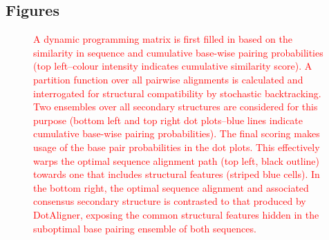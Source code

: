 \documentclass{bmcart}
\begin{document}
\begin{backmatter}





\section*{Figures}

\begin{figure}[h!]
 \caption {
 \textcolor{red}{
  A dynamic  programming matrix is first filled in based on the similarity in sequence 
  and cumulative base-wise pairing probabilities (top left--colour intensity
  indicates cumulative similarity score).  A partition function over all
  pairwise alignments is calculated and interrogated for structural
  compatibility by stochastic backtracking.  Two ensembles over all
  secondary structures are considered for this purpose (bottom left and
  top right dot plots--blue lines indicate cumulative base-wise pairing
  probabilities). The final scoring makes usage of the base pair
  probabilities in the dot plots. This effectively warps the optimal
  sequence alignment path (top left, black outline) towards one that
  includes structural features (striped blue cells).  In the bottom
  right, the optimal sequence alignment and associated consensus
  secondary structure is contrasted to that produced by DotAligner,
  exposing the common structural features hidden in the suboptimal base
  pairing ensemble of both sequences. 
 }}
\end{figure}



\end{backmatter}
\end{document}
